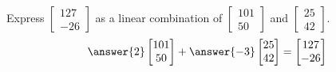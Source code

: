 \documentclass{ximera}
\author{Anna Davis}
\begin{document}
\begin{exercise}
Express $\begin{bmatrix}127\\-26\end{bmatrix}$ as a linear combination of $\begin{bmatrix}101\\50\end{bmatrix}$ and $\begin{bmatrix}25\\42\end{bmatrix}$.
$$\answer{2}\begin{bmatrix}101\\50\end{bmatrix}+\answer{-3}\begin{bmatrix}25\\42\end{bmatrix}=\begin{bmatrix}127\\-26\end{bmatrix}$$
\end{exercise}
\end{document}
